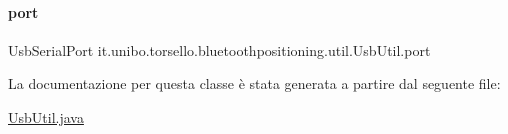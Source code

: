 \paragraph{\texorpdfstring{port}{port}}
{\footnotesize\ttfamily Usb\+Serial\+Port it.\+unibo.\+torsello.\+bluetoothpositioning.\+util.\+Usb\+Util.\+port\hspace{0.3cm}{\ttfamily [private]}}



La documentazione per questa classe è stata generata a partire dal seguente file\+:\begin{DoxyCompactItemize}
\item 
\hyperlink{UsbUtil_8java}{Usb\+Util.\+java}\end{DoxyCompactItemize}
